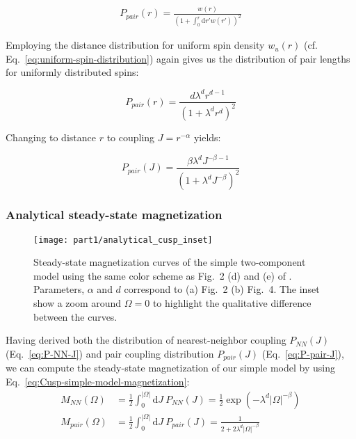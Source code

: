 \begin{align}\label{eq:pair-distribution}
	P_{pair}(r) = \frac{w(r)}{\left(1+\int_0^r\!\mathrm{d}r' w(r')\right)^2}
\end{align}

Employing the distance distribution for uniform spin density $w_u(r)$ (cf. Eq.~\ref{eq:uniform-spin-distribution}) again gives us the distribution of pair lengths for uniformly distributed spins:

\begin{equation}\label{eq:log-logistic-distribution}
	P_{pair}(r) = \frac{d\lambda^d r^{d-1}}{\left(1 + \lambda^d r^d\right)^2 }
\end{equation}


Changing to distance $r$ to coupling $J=r^{-\alpha}$ yields:

\begin{equation}\label{eq:P-pair-J}
	P_{pair}(J) = \frac{\beta\lambda^d J^{-\beta-1}}{\left(1+\lambda^{d}J^{-\beta}\right)^2}
\end{equation}

\subsubsection{Analytical steady-state magnetization}


\begin{figure}[htb]
	\centering
	\texttt{[image: part1/analytical\_cusp\_inset]}
	\caption{Steady-state magnetization curves of the simple two-component model using the same color scheme as Fig.~2 (d) and (e) of \cite{franzEmergentPairLocalization2022}. Parameters, $\alpha$ and $d$ correspond to (a) Fig.~2 (b) Fig.~4.
	The inset show a zoom around $\Omega=0$ to highlight the qualitative difference between the curves.
	}
	\label{fig:analytical-cusp}
\end{figure}

Having derived both the distribution of nearest-neighbor coupling $P_{NN}(J)$ (Eq.~\ref{eq:P-NN-J}) and pair coupling distribution $P_{pair}(J)$ (Eq.~\ref{eq:P-pair-J}), we can compute the steady-state magnetization of our simple model by using Eq.~\ref{eq:Cusp-simple-model-magnetization}:
\begin{align}
	M_{NN}(\Omega) &= \frac{1}{2}\int_0^{|\Omega|}\!\mathrm{d}J\ P_{NN}(J) = \frac{1}{2}\exp(-\lambda^d |\Omega|^{-\beta})\\
	M_{pair}(\Omega) &= \frac{1}{2}\int_0^{|\Omega|}\!\mathrm{d}J\ P_{pair}(J) = \frac{1}{2+2\lambda^{d}|\Omega|^{-\beta}}
\end{align}

